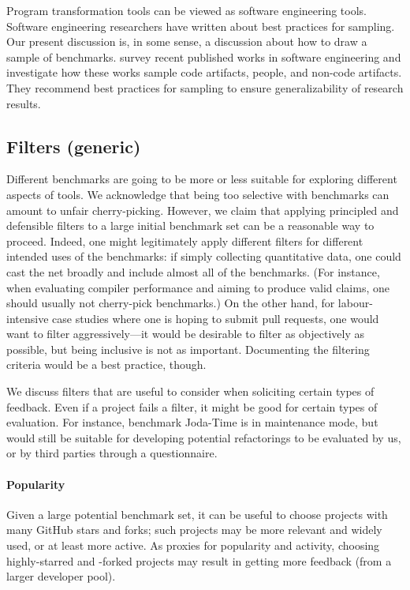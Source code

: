 Program transformation tools can be viewed as software engineering
tools.  Software engineering researchers have written about best
practices for sampling.  Our present discussion is, in some sense, a
discussion about how to draw a sample of
benchmarks.  survey recent
published works in software engineering and investigate how these works sample code
artifacts, people, and non-code artifacts.  They recommend best
practices for sampling to ensure generalizability of research results.

\subsection{Filters (generic)}
Different benchmarks are going to be more or less suitable for exploring different aspects of tools. We acknowledge that being too selective with benchmarks can amount to unfair cherry-picking. However, we claim that applying principled and defensible filters to a large initial benchmark set can be a reasonable way to proceed. Indeed, one might legitimately apply different filters for different intended uses of the benchmarks: if simply collecting quantitative data, one could cast the net broadly and include almost all of the benchmarks. (For instance, when evaluating compiler performance and aiming to produce valid claims, one should usually not cherry-pick benchmarks.) On the other hand, for labour-intensive case studies where one is hoping to submit pull requests, one would want to filter aggressively---it would be desirable to filter as objectively as possible, but being inclusive is not as important. Documenting the filtering criteria would be a best practice, though.

We discuss filters that are useful to consider when soliciting certain types of feedback. Even if a project fails a filter, it might be good for certain types of evaluation. For instance, benchmark Joda-Time is in maintenance mode, but would still be suitable for developing potential refactorings to be evaluated by us, or by third parties through a questionnaire.

\paragraph{Popularity}
Given a large potential benchmark set, it can be useful to choose projects with many GitHub stars and forks; such projects may be more relevant and widely used, or at least more active. As proxies for popularity and activity, choosing highly-starred and -forked projects may result in getting more feedback (from a larger developer pool).

